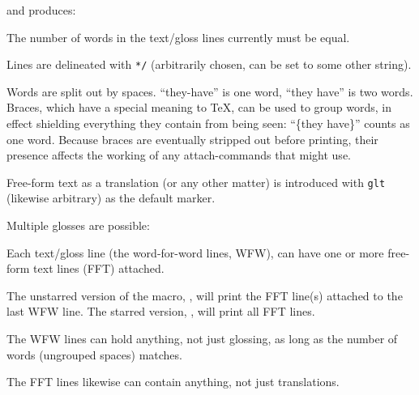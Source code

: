 \documentclass{article}
\begin{document}
and produces:

\begin{exe}
\ex
{}
\end{exe}

The number of words in the text/gloss lines currently must be equal.

Lines are delineated with \verb|*/| (arbitrarily chosen, can be set to some other string).

Words are split out by spaces. ``they-have'' is one word, ``they have'' is two words. Braces, which have a special meaning to \TeX, can be used to group words, in effect shielding everything they contain from being seen: ``\{they have\}'' counts as one word. Because braces are eventually stripped out before printing, their presence affects the working of any attach-commands that  might use.

Free-form text as a translation (or any other matter) is introduced with \verb|glt| (likewise arbitrary) as the default marker.

Multiple glosses are possible:


\begin{exe}
    \ex
{}
\end{exe}

Each text/gloss line (the word-for-word lines, WFW), can have one or more free-form text lines (FFT) attached.

The unstarred version of the macro, , will print the FFT line(s) attached to the last WFW line. The starred version, , will print all FFT lines.

\begin{exe}
    \ex
{}
\end{exe}



The WFW lines can hold anything, not just glossing, as long as the number of words (\glie ungrouped spaces) matches.

The FFT lines likewise can contain anything, not just translations.
\end{document}
